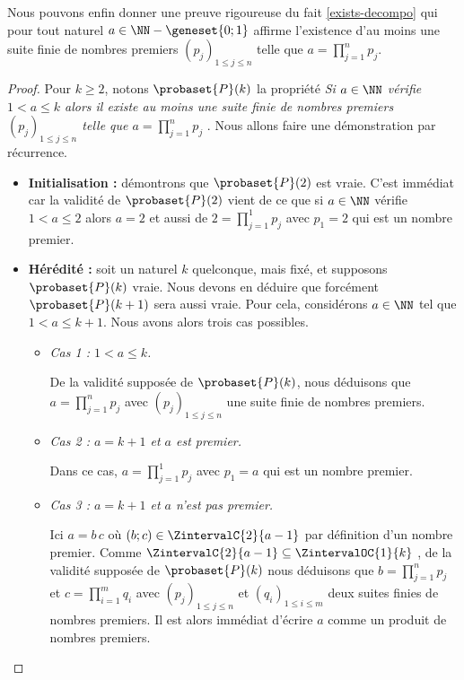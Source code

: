 Nous pouvons enfin donner une preuve rigoureuse du fait \ref{exists-decompo} qui pour tout naturel $a \in \NN - \geneset{0 ; 1}$ affirme l'existence d'au moins une suite finie de nombres premiers $(p_j)_{1 \leq j \leq n}$ telle que $\displaystyle a = \prod_{j=1}^{n} p_j$.


\begin{proof}
	Pour $k \geq 2$, notons $\probaset{P}(k)$ la propriété \emph{\og Si $a \in \NN$ vérifie $1 < a \leq k$ alors il existe au moins une suite finie de nombres premiers $(p_j)_{1 \leq j \leq n}$ telle que $\displaystyle a = \prod_{j=1}^{n} p_j$ \fg}. Nous allons faire une démonstration par récurrence.
	
	\begin{itemize}[label=\small\textbullet]
		\medskip
		\item \textbf{Initialisation :} démontrons que $\probaset{P}(2)$ est vraie. C'est immédiat car la validité de $\probaset{P}(2)$ vient de ce que si $a \in \NN$ vérifie $1 < a \leq 2$ alors $a = 2$ et aussi de $\displaystyle 2 = \prod_{j=1}^{1} p_j$ avec $p_1 = 2$ qui est un nombre premier. 


		\medskip
		\item \textbf{Hérédité :} soit un naturel $k$ quelconque, mais fixé, et supposons $\probaset{P}(k)$ vraie. Nous devons en déduire que forcément $\probaset{P}(k+1)$ sera aussi vraie.
		Pour cela, considérons $a \in \NN$ tel que $1 < a \leq k + 1$. Nous avons alors trois cas possibles.
		\begin{itemize}
			\smallskip
			\item \emph{Cas 1 : $1 < a \leq k$.}
			      
			      De la validité supposée de $\probaset{P}(k)$, nous déduisons que $\displaystyle a = \prod_{j=1}^{n} p_j$ avec $(p_j)_{1 \leq j \leq n}$ une suite finie de nombres premiers. 

			\smallskip
			\item \emph{Cas 2 : $a = k + 1$ et $a$ est premier.}
			      
			      Dans ce cas, $\displaystyle a = \prod_{j=1}^{1} p_j$ avec $p_1 = a$ qui est un nombre premier. 

			\smallskip
			\item \emph{Cas 3 : $a = k + 1$ et $a$ n'est pas premier.}
			      
			      Ici $a = b \, c$ où $(b ; c) \in \ZintervalC{2}{a-1}$ par définition d'un nombre premier.
			      Comme $\ZintervalC{2}{a-1} \subseteq \ZintervalOC{1}{k}$ , de la validité supposée de $\probaset{P}(k)$ nous déduisons que $\displaystyle b = \prod_{j=1}^{n} p_j$  et $\displaystyle c = \prod_{i=1}^{m} q_i$ avec $(p_j)_{1 \leq j \leq n}$ et $(q_i)_{1 \leq i \leq m}$ deux suites finies de nombres premiers. Il est alors immédiat d'écrire $a$ comme un produit de nombres premiers.
		\end{itemize}



\end{itemize}
\end{proof}

